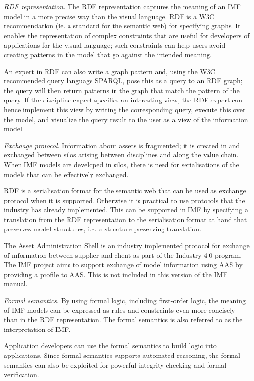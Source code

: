 \documentclass[../main.tex]{subfiles}
\begin{document}
\textit{RDF representation.} The RDF representation captures the
meaning of an IMF model in a more precise way than the visual
language.  RDF is a W3C recommendation (ie. a standard for the
semantic web) for specifying graphs.  It enables the representation of
complex constraints that are useful for developers of applications for
the visual language; such constraints can help users avoid creating
patterns in the model that go against the intended meaning.

An expert in RDF can also write a graph pattern and, using the W3C
recommended query language SPARQL, pose this as a query to an RDF
graph; the query will then return patterns in the graph that match the
pattern of the query.  If the discipline expert specifies an
interesting view, the RDF expert can hence implement this view by
writing the corresponding query, execute this over the model, and visualize the query result to the user as a view of the information model. 

\textit{Exchange protocol}.
Information about assets is
fragmented; it is created in and exchanged between silos arising
between disciplines and along the value chain. When IMF models are
developed in silos, there is need for serialisations of the
models that can be effectively exchanged.

RDF is a serialisation format for the semantic web that can be used as
exchange protocol when it is supported.  Otherwise it is practical to
use protocols that the industry has already implemented.  This can be
supported in IMF by specifying a translation from the RDF
representation to the serialisation format at hand that preserves
model structures, i.e. a structure preserving translation.

The Asset Administration Shell is an industry implemented protocol for
exchange of information between supplier and client as part of the
Industry 4.0 program. The IMF project aims to support exchange of
model information using AAS by providing a profile to AAS. This is not
included in this version of the IMF manual.

\textit{Formal semantics}.
 By using formal logic, including
first-order logic, the meaning of IMF models can be expressed as rules
and constraints even more concisely than in the RDF
representation. The formal semantics is also referred to as the
interpretation of IMF.

Application developers can use the formal semantics to build logic
into applications.  Since formal semantics supports automated
reasoning, the formal semantics can also be exploited for powerful
integrity checking and formal verification.
\end{document}
